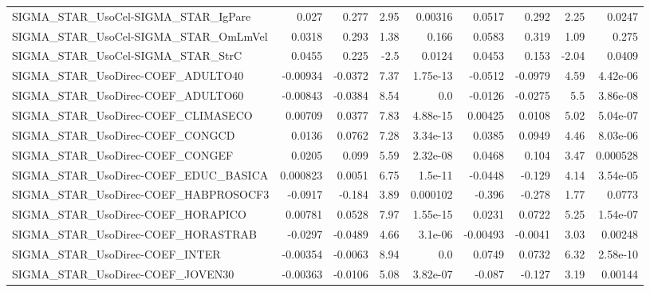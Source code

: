 \begin{tabular}{lrrrrrrrr}
SIGMA\_STAR\_UsoCel-SIGMA\_STAR\_IgPare    &       0.027 &        0.277 &     2.95 &  0.00316 &     0.0517 &       0.292 &         2.25 &        0.0247 \\
SIGMA\_STAR\_UsoCel-SIGMA\_STAR\_OmLmVel   &      0.0318 &        0.293 &     1.38 &    0.166 &     0.0583 &       0.319 &         1.09 &         0.275 \\
SIGMA\_STAR\_UsoCel-SIGMA\_STAR\_StrC      &      0.0455 &        0.225 &     -2.5 &   0.0124 &     0.0453 &       0.153 &        -2.04 &        0.0409 \\
SIGMA\_STAR\_UsoDirec-COEF\_ADULTO40      &    -0.00934 &      -0.0372 &     7.37 & 1.75e-13 &    -0.0512 &     -0.0979 &         4.59 &      4.42e-06 \\
SIGMA\_STAR\_UsoDirec-COEF\_ADULTO60      &    -0.00843 &      -0.0384 &     8.54 &      0.0 &    -0.0126 &     -0.0275 &          5.5 &      3.86e-08 \\
SIGMA\_STAR\_UsoDirec-COEF\_CLIMASECO     &     0.00709 &       0.0377 &     7.83 & 4.88e-15 &    0.00425 &      0.0108 &         5.02 &      5.04e-07 \\
SIGMA\_STAR\_UsoDirec-COEF\_CONGCD        &      0.0136 &       0.0762 &     7.28 & 3.34e-13 &     0.0385 &      0.0949 &         4.46 &      8.03e-06 \\
SIGMA\_STAR\_UsoDirec-COEF\_CONGEF        &      0.0205 &        0.099 &     5.59 & 2.32e-08 &     0.0468 &       0.104 &         3.47 &      0.000528 \\
SIGMA\_STAR\_UsoDirec-COEF\_EDUC\_BASICA   &    0.000823 &       0.0051 &     6.75 &  1.5e-11 &    -0.0448 &      -0.129 &         4.14 &      3.54e-05 \\
SIGMA\_STAR\_UsoDirec-COEF\_HABPROSOCF3   &     -0.0917 &       -0.184 &     3.89 & 0.000102 &     -0.396 &      -0.278 &         1.77 &        0.0773 \\
SIGMA\_STAR\_UsoDirec-COEF\_HORAPICO      &     0.00781 &       0.0528 &     7.97 & 1.55e-15 &     0.0231 &      0.0722 &         5.25 &      1.54e-07 \\
SIGMA\_STAR\_UsoDirec-COEF\_HORASTRAB     &     -0.0297 &      -0.0489 &     4.66 &  3.1e-06 &   -0.00493 &     -0.0041 &         3.03 &       0.00248 \\
SIGMA\_STAR\_UsoDirec-COEF\_INTER         &    -0.00354 &      -0.0063 &     8.94 &      0.0 &     0.0749 &      0.0732 &         6.32 &      2.58e-10 \\
SIGMA\_STAR\_UsoDirec-COEF\_JOVEN30       &    -0.00363 &      -0.0106 &     5.08 & 3.82e-07 &     -0.087 &      -0.127 &         3.19 &       0.00144 \\

\end{tabular}
